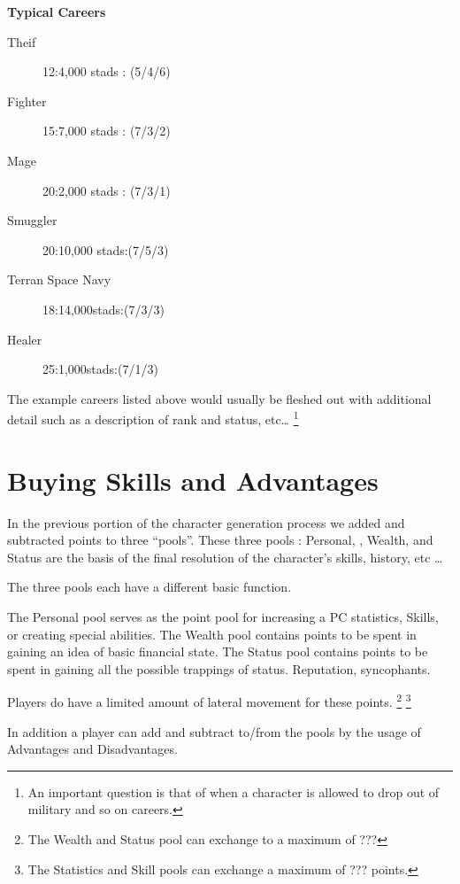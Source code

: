 {\bf Typical Careers}
	\begin{description}

		\item[Theif]
		        12:4,000 stads : (5/4/6)

		\item[Fighter]
		        15:7,000 stads : (7/3/2)

		\item[Mage]
		        20:2,000 stads : (7/3/1)

		\item[Smuggler]
		       20:10,000 stads:(7/5/3)

		\item[Terran Space Navy]
		       18:14,000stads:(7/3/3)

		\item[Healer]
		       25:1,000stads:(7/1/3)

	\end{description}

The example careers listed above would usually be fleshed out with
additional detail such as a description of rank and status, etc\dots
\footnote{An important question is that of when a character is
allowed to drop out of military and so on careers.}

\section{Buying Skills and Advantages}

In the previous portion of the character generation process we added
and subtracted points to three ``pools''. These three pools : Personal,
, Wealth, and Status are the basis of the final resolution of
the character's skills, history, etc \dots

The three pools each have a different basic function.

The Personal pool serves as the point pool for
increasing a PC statistics, Skills,  or creating special abilities.
The Wealth pool contains points to be spent in gaining an idea of
basic financial state.
The Status pool contains points to be spent in gaining all the
possible trappings of status. Reputation, syncophants.

Players do have a limited amount of lateral movement for these
points. \footnote{The Wealth and Status pool can exchange to a maximum of ???}
\footnote{The Statistics and Skill pools can exchange a maximum of ??? points.}

In addition a player can add and subtract to/from the pools by the
usage of Advantages and Disadvantages.

